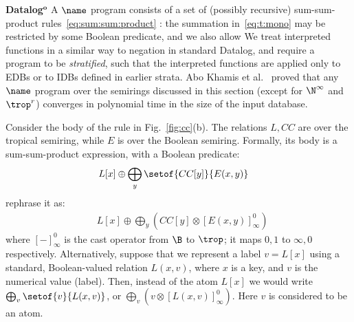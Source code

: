 {\bf Datalog$^{\mathbf{o}}$}  A $\name$ program consists of a set of (possibly
recursive) sum-sum-product rules~\eqref{eq:sum:sum:product}
 : the summation
in~\eqref{eq:t:mono} may be restricted by some Boolean predicate,
and we also allow 
We treat interpreted functions in a similar way to negation in
standard Datalog, and require a program to be {\em stratified}, such
that the interpreted functions are applied only to EDBs or to IDBs
defined in earlier strata.   Abo Khamis et
al.~\cite{khamis21:_conver_datal_pre_semir} proved that any $\name$
program over the semirings discussed in this section (except for
$\N^\infty$ and $\trop^r$) converges in polynomial time in the size of
the input database.

\begin{ex}
  Consider the body of the rule in Fig.~\ref{fig:cc}(b).
  The relations $L, CC$ are over the tropical semiring, while $E$ is
  over the Boolean semiring.  Formally, its body is a sum-sum-product
  expression, with a Boolean predicate:
%
  \begin{align*}
    & L[x] \oplus \bigoplus_y \setof{CC[y]}{E(x,y)}
  \end{align*}
%
   rephrase it as:
%
  \begin{align*}
    & L[x] \oplus \bigoplus_y \left(CC[y] \otimes [E(x,y)]_\infty^0\right)
  \end{align*}
%
  where $[-]_\infty^0$ is the cast operator from $\B$ to $\trop$; it
  maps $0,1$ to $\infty,0$ respectively.  Alternatively, suppose that
  we represent a label $v=L[x]$ using a standard, Boolean-valued
  relation $L(x,v)$, where $x$ is a key, and $v$ is the numerical
  value (label).  Then, instead of the atom $L[x]$ we would write
  $\bigoplus_v \setof{v}{L(x,v)}$, or
  $\bigoplus_v \left(v \otimes [L(x,v)]_\infty^0\right)$.  Here $v$ is
  considered to be an atom.
\end{ex}


